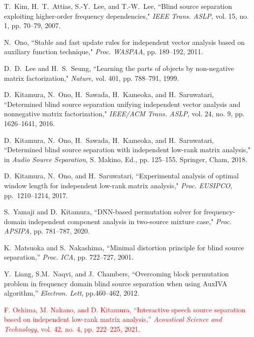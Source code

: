 \documentclass[honka]{nitkagawathesis}%
\newcommand{\red}[1]{\textcolor{red}{#1}}
\begin{document}
\begin{thebibliography}{99}
  T.~Kim, H.~T.~Attias, S.-Y.~Lee, and T.-W.~Lee, ``Blind source separation exploiting higher-order frequency dependencies," {\em  IEEE Trans. ASLP}, vol. 15, no. 1, pp. 70--79, 2007.
  
  N.~Ono, ``Stable and fast update rules for independent vector analysis based on auxiliary function technique," {\em  Proc. WASPAA}, pp. 189--192, 2011.
  
  D.~D.~Lee and H.~S.~Seung, ``Learning the parts of objects by non-negative matrix factorization," {\em Nature}, vol. 401, pp. 788--791, 1999.
  
  D.~Kitamura, N.~Ono, H.~Sawada, H.~Kameoka, and H.~Saruwatari, ``Determined blind source separation unifying independent vector analysis and nonnegative matrix factorization,"  {\em IEEE/ACM Trans. ASLP}, vol. 24, no. 9, pp. 1626--1641, 2016.
  
  D.~Kitamura, N.~Ono, H.~Sawada, H.~Kameoka, and H.~Saruwatari, ``Determined blind source separation with independent low-rank matrix analysis," in  {\em Audio Source Separation}, S. Makino, Ed., pp. 125--155. Springer, Cham, 2018.
  
  D.~Kitamura, N.~Ono, and H.~Saruwatari, ``Experimental analysis of optimal window length for independent low-rank matrix analysis,"  {\em Proc. EUSIPCO}, pp.~1210--1214, 2017.

  S.~Yamaji and D.~Kitamura, ``DNN-based permutation solver for frequency-domain independent component analysis in two-source mixture case," {\em  Proc. APSIPA}, pp. 781–787, 2020.
  
  
  K.~Matsuoka and S.~Nakashima, ``Minimal distortion principle for blind source separation,'' {\em Proc. ICA}, pp. 722--727, 2001.
  
  Y.~Liang, S.M.~Naqvi, and J.~Chambers, ``Overcoming block permutation
  problem in frequency domain blind source separation when using
  AuxIVA algorithm,'' {\em Electron. Lett}, pp.460--462, 2012.

  \red{F. Oshima, M. Nakano, and D. Kitamura, ``Interactive speech source separation based on independent low-rank matrix analysis,'' {\em Acoustical Science and Technology}, vol. 42, no. 4, pp. 222--225, 2021.}
  

\end{thebibliography}
\end{document}
